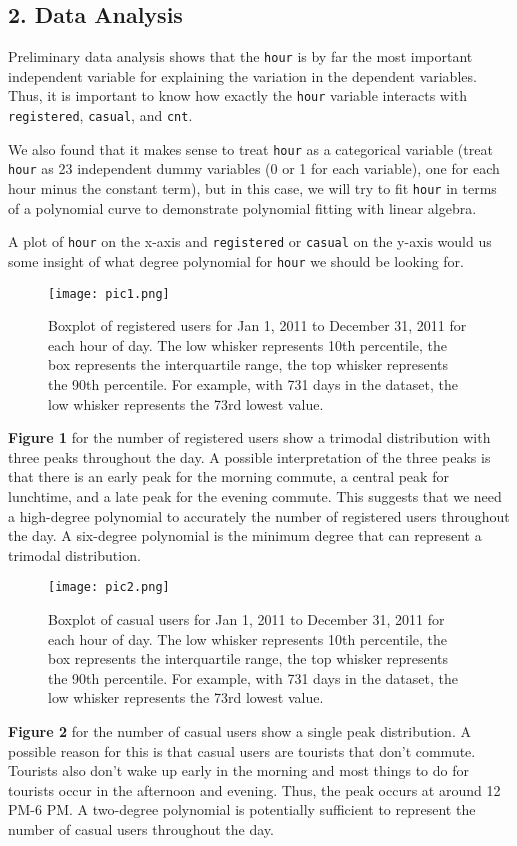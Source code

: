 \documentclass[
]{article}
\begin{document}
\hypertarget{data-analysis}{%
\subsection{2. Data Analysis}\label{data-analysis}}

Preliminary data analysis shows that the \texttt{hour} is by far the most important independent variable for explaining the variation in the dependent variables. Thus, it is important to know how exactly the \texttt{hour} variable interacts with \texttt{registered}, \texttt{casual}, and \texttt{cnt}.

We also found that it makes sense to treat \texttt{hour} as a
categorical variable (treat \texttt{hour} as 23 independent dummy
variables (0 or 1 for each variable), one for each hour minus the
constant term), but in this case, we will try to fit \texttt{hour} in terms of a polynomial curve to demonstrate polynomial fitting with linear algebra.

A plot of \texttt{hour} on the x-axis and \texttt{registered} or
\texttt{casual} on the y-axis would us some insight of what degree polynomial for \texttt{hour} we should be looking for.

\begin{figure}
\centering
\texttt{[image: pic1.png]}
\caption{Boxplot of registered users for Jan 1, 2011 to December 31, 2011 for each hour of day. The low whisker represents 10th percentile, the box represents the interquartile range, the top whisker represents the 90th percentile. For example, with 731 days in the dataset, the low whisker represents the 73rd lowest value.}
\end{figure}

\textbf{Figure 1} for the number of registered users show a trimodal distribution with three peaks throughout the day. A possible interpretation of the three peaks is that there is an early peak for the morning commute, a central peak for lunchtime, and a late peak for the evening commute. This suggests that we need a high-degree polynomial to accurately the number of registered users throughout the day. A six-degree polynomial is the minimum degree that can represent a trimodal distribution.

\begin{figure}
\centering
\texttt{[image: pic2.png]}
\caption{Boxplot of casual users for Jan 1, 2011 to December 31, 2011 for each hour of day. The low whisker represents 10th percentile, the box represents the interquartile range, the top whisker represents the 90th percentile. For example, with 731 days in the dataset, the low whisker represents the 73rd lowest value.}
\end{figure}
\newpage
\textbf{Figure 2} for the number of casual users show a single peak distribution. A possible reason for this is that casual users are tourists that don't commute. Tourists also don't wake up early in the morning and most things to do for tourists occur in the afternoon and evening. Thus, the peak occurs at around 12 PM-6 PM. A two-degree polynomial is potentially sufficient to represent the number of casual users throughout the day.
\end{document}
